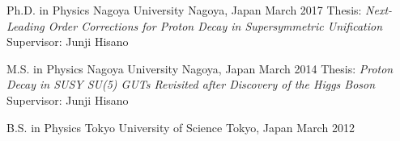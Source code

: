 \cventry
  {Ph.D. in Physics}
  {Nagoya University}
  {Nagoya, Japan}
  {March 2017}
  {
    {\small Thesis: \emph{Next-Leading Order Corrections for Proton Decay in Supersymmetric Unification}}\\
    {\small Supervisor: Junji Hisano}
  }

\cventry
  {M.S. in Physics}
  {Nagoya University}
  {Nagoya, Japan}
  {March 2014}
  {
    {\small Thesis: \emph{Proton Decay in SUSY SU(5) GUTs Revisited after Discovery of the Higgs Boson}}\\
    {\small Supervisor: Junji Hisano}
  }

\cventry
  {B.S. in Physics}
  {Tokyo University of Science}
  {Tokyo, Japan}
  {March 2012}
  {}